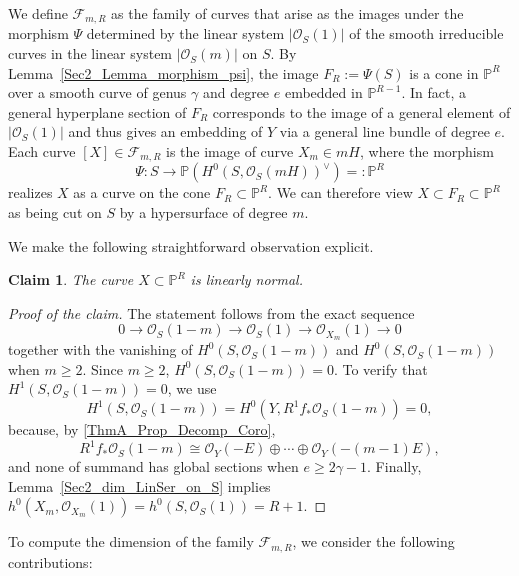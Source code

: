 \documentclass[a4paper,12pt]{amsart}
\newtheorem{claim}[thm]{Claim}
\begin{document}
We define $\mathcal{F}_{m, R}$ as the family of curves that arise as the images under the morphism $\Psi$ determined by the linear system $|\mathcal{O}_S (1)|$ of the smooth irreducible curves in the linear system $|\mathcal{O}_S (m)|$ on $S$. By \textnormal{Lemma~\ref{Sec2_Lemma_morphism_psi}}, the image $F_R := \Psi (S)$ is a cone in $\mathbb{P}^R$ over a smooth curve of genus $\gamma$ and degree $e$ embedded in $\mathbb{P}^{R-1}$. In fact, a general hyperplane section of $F_R$ corresponds to the image of a general element of $|\mathcal{O}_S (1)|$ and thus gives an embedding of $Y$ via a general line bundle of degree $e$. Each curve $[X] \in \mathcal{F}_{m, R}$ is the image of curve $X_m \in mH$, where the morphism
\[
 \Psi : S \to \mathbb{P} (H^0 (S, \mathcal{O}_S (mH))^{\vee}) =: \mathbb{P}^{R}
\]
realizes $X$ as a curve on the cone $F_R \subset \mathbb{P}^R$. We can therefore view $X \subset F_R \subset \mathbb{P}^R$ as being cut on $S$ by a hypersurface of degree $m$.

We make the following straightforward observation explicit.

\begin{claim}
The curve $X \subset \mathbb{P}^{R}$ is linearly normal.
\end{claim}
\begin{proof}[Proof of the claim]
The statement follows from the exact sequence
\[
 0 \to \mathcal{O}_S (1-m) \to \mathcal{O}_S (1) \to \mathcal{O}_{X_m} (1) \to 0
\]
together with the vanishing of $H^0(S, \mathcal{O}_S(1 - m))$ and $H^0(S, \mathcal{O}_S(1 - m))$ when $m \geq 2$. Since $m \geq 2$, $H^0(S, \mathcal{O}_S(1 - m)) = 0$. To verify that $H^1(S, \mathcal{O}_S(1 - m)) = 0$, we use
\[
 H^1 (S, \mathcal{O}_S (1-m)) = H^0 (Y, R^1 f_{\ast} \mathcal{O}_S (1-m)) = 0 ,
\]
because, by \eqref{ThmA_Prop_Decomp_Coro},
\[
 R^1 f_{\ast} \mathcal{O}_S (1-m) \cong \mathcal{O}_Y (-E) \oplus \cdots \oplus \mathcal{O}_Y (-(m-1)E) ,
\]
and none of summand has global sections when $e \geq 2\gamma - 1$. Finally, \textnormal{Lemma~\ref{Sec2_dim_LinSer_on_S}} implies $h^0 (X_m, \mathcal{O}_{X_m} (1)) = h^0 (S, \mathcal{O}_S (1)) = R+1$.
\end{proof}

To compute the dimension of the family $\mathcal{F}_{m,R}$, we consider the following contributions:
\end{document}
